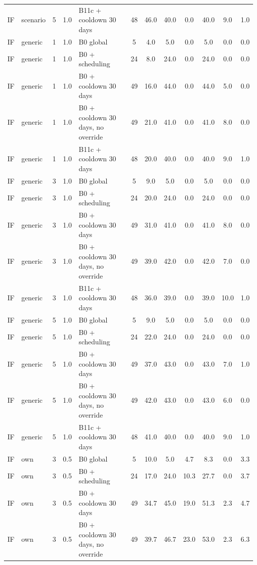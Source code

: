 \begin{longtable}{lllllccccccc}
IF & scenario & 5 & 1.0 & B11c + cooldown 30 days & 48 & 46.0 & 40.0 & 0.0 & 40.0 & 9.0 & 1.0 \\
IF & generic & 1 & 1.0 & B0 global & 5 & 4.0 & 5.0 & 0.0 & 5.0 & 0.0 & 0.0 \\
IF & generic & 1 & 1.0 & B0 + scheduling & 24 & 8.0 & 24.0 & 0.0 & 24.0 & 0.0 & 0.0 \\
IF & generic & 1 & 1.0 & B0 + cooldown 30 days & 49 & 16.0 & 44.0 & 0.0 & 44.0 & 5.0 & 0.0 \\
IF & generic & 1 & 1.0 & B0 + cooldown 30 days, no override & 49 & 21.0 & 41.0 & 0.0 & 41.0 & 8.0 & 0.0 \\
IF & generic & 1 & 1.0 & B11c + cooldown 30 days & 48 & 20.0 & 40.0 & 0.0 & 40.0 & 9.0 & 1.0 \\
IF & generic & 3 & 1.0 & B0 global & 5 & 9.0 & 5.0 & 0.0 & 5.0 & 0.0 & 0.0 \\
IF & generic & 3 & 1.0 & B0 + scheduling & 24 & 20.0 & 24.0 & 0.0 & 24.0 & 0.0 & 0.0 \\
IF & generic & 3 & 1.0 & B0 + cooldown 30 days & 49 & 31.0 & 41.0 & 0.0 & 41.0 & 8.0 & 0.0 \\
IF & generic & 3 & 1.0 & B0 + cooldown 30 days, no override & 49 & 39.0 & 42.0 & 0.0 & 42.0 & 7.0 & 0.0 \\
IF & generic & 3 & 1.0 & B11c + cooldown 30 days & 48 & 36.0 & 39.0 & 0.0 & 39.0 & 10.0 & 1.0 \\
IF & generic & 5 & 1.0 & B0 global & 5 & 9.0 & 5.0 & 0.0 & 5.0 & 0.0 & 0.0 \\
IF & generic & 5 & 1.0 & B0 + scheduling & 24 & 22.0 & 24.0 & 0.0 & 24.0 & 0.0 & 0.0 \\
IF & generic & 5 & 1.0 & B0 + cooldown 30 days & 49 & 37.0 & 43.0 & 0.0 & 43.0 & 7.0 & 1.0 \\
IF & generic & 5 & 1.0 & B0 + cooldown 30 days, no override & 49 & 42.0 & 43.0 & 0.0 & 43.0 & 6.0 & 0.0 \\
IF & generic & 5 & 1.0 & B11c + cooldown 30 days & 48 & 41.0 & 40.0 & 0.0 & 40.0 & 9.0 & 1.0 \\
IF & own & 3 & 0.5 & B0 global & 5 & 10.0 & 5.0 & 4.7 & 8.3 & 0.0 & 3.3 \\
IF & own & 3 & 0.5 & B0 + scheduling & 24 & 17.0 & 24.0 & 10.3 & 27.7 & 0.0 & 3.7 \\
IF & own & 3 & 0.5 & B0 + cooldown 30 days & 49 & 34.7 & 45.0 & 19.0 & 51.3 & 2.3 & 4.7 \\
IF & own & 3 & 0.5 & B0 + cooldown 30 days, no override & 49 & 39.7 & 46.7 & 23.0 & 53.0 & 2.3 & 6.3 \\

\end{longtable}
